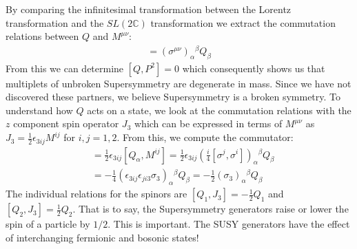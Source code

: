 By comparing the infinitesimal transformation between the Lorentz transformation and the $SL(2\mathbb{C})$ transformation we extract the commutation relations between $Q$ and $M^{\mu\nu}$:
\begin{align*}
[Q_\alpha, M^{\mu\nu}] = ( \sigma^{\mu\nu})_{\alpha}{}^{\beta} Q_\beta 
\end{align*}
From this we can determine $[Q, P^2] = 0$ which consequently shows us that multiplets of unbroken Supersymmetry
are degenerate in mass. Since we have not discovered these partners, we believe Supersymmetry is a broken symmetry. To understand how $Q$ acts on a state, we look at the commutation relations with the $z$ component spin operator $J_3$ which can be expressed in terms of $M^{\mu\nu}$ as $J_3 = \frac{1}{2}\epsilon_{3ij}M^{ij}$ for $i,j=1,2$. From this, we compute the commutator:
\begin{align*}
[Q_{\alpha}, J_3] &= \frac{1}{2}\epsilon_{3ij}[Q_\alpha, M^{ij}] = \frac{1}{2}\epsilon_{3ij} \left ( \frac{i}{4} [\sigma^j, \sigma^i] \right )_\alpha{}^\beta Q_\beta\\
&= -\frac{1}{4}(\epsilon_{3ij} \epsilon_{ji3} \sigma_3)_\alpha{}^\beta Q_\beta = -\frac{1}{2}(\sigma_3)_\alpha{}^\beta Q_\beta 
\end{align*}
The individual relations for the spinors are $[Q_1,J_3] = -\frac{1}{2}Q_1$ and $[Q_2, J_3] = \frac{1}{2} Q_2$.
That is to say, the Supersymmetry generators raise or lower the spin of a particle by $1/2$. This is important. The SUSY generators  
have the effect of interchanging fermionic and bosonic states!

